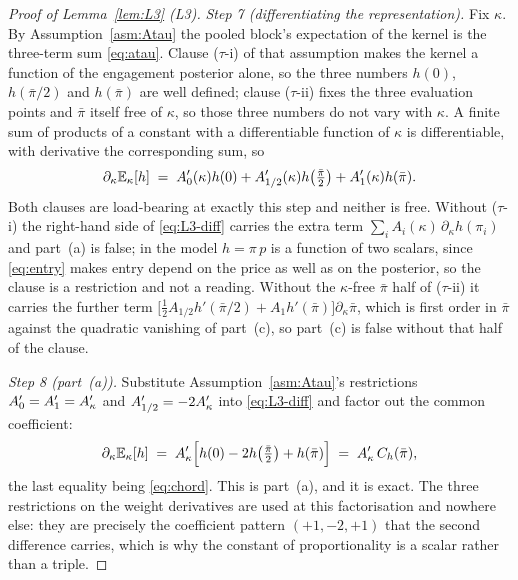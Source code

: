 \begin{proof}[Proof of Lemma~\ref{lem:L3} (L3)]
\emph{Step 7 (differentiating the representation).} Fix $\kappa$. By Assumption~\ref{asm:Atau} the
pooled block's expectation of the kernel is the three-term sum \eqref{eq:atau}. Clause ($\tau$-i) of
that assumption makes the kernel a function of the engagement posterior alone, so the three numbers
$h(0)$, $h(\bar\pi/2)$ and $h(\bar\pi)$ are well defined; clause ($\tau$-ii) fixes the three
evaluation points and $\bar\pi$ itself free of $\kappa$, so those three numbers do not vary with
$\kappa$. A finite sum of products of a constant with a differentiable function of $\kappa$ is
differentiable, with derivative the corresponding sum, so
\begin{equation}
\label{eq:L3-diff}
\partial_\kappa \mathbb{E}_\kappa[h] \;=\; A_0'(\kappa)h(0)
 + A_{1/2}'(\kappa)h\!\left(\tfrac{\bar\pi}{2}\right) + A_1'(\kappa)h(\bar\pi).
\end{equation}
Both clauses are load-bearing at exactly this step and neither is free. Without ($\tau$-i) the
right-hand side of \eqref{eq:L3-diff} carries the extra term
$\sum_i A_i(\kappa)\,\partial_\kappa h(\pi_i)$ and part~(a) is false; in the model
$h = \pi\,p$ is a function of two scalars, since \eqref{eq:entry} makes entry depend on the price as
well as on the posterior, so the clause is a restriction and not a reading. Without the $\kappa$-free
$\bar\pi$ half of ($\tau$-ii) it carries the further term
$\bigl[\tfrac12 A_{1/2}h'(\bar\pi/2) + A_1 h'(\bar\pi)\bigr]\partial_\kappa\bar\pi$, which is first
order in $\bar\pi$ against the quadratic vanishing of part~(c), so part~(c) is false without that
half of the clause.

\emph{Step 8 (part~(a)).} Substitute Assumption~\ref{asm:Atau}'s restrictions
$A_0' = A_1' = A'_{\kappa}$ and $A_{1/2}' = -2A'_{\kappa}$ into \eqref{eq:L3-diff} and factor out the common
coefficient:
\begin{equation}
\label{eq:L3-parta}
\partial_\kappa \mathbb{E}_\kappa[h]
 \;=\; A'_{\kappa}\Bigl[h(0) - 2h\!\left(\tfrac{\bar\pi}{2}\right) + h(\bar\pi)\Bigr]
 \;=\; A'_{\kappa}\,C_h(\bar\pi),
\end{equation}
the last equality being \eqref{eq:chord}. This is part~(a), and it is exact. The three restrictions
on the weight derivatives are used at this factorisation and nowhere else: they are precisely the
coefficient pattern $(+1,-2,+1)$ that the second difference carries, which is why the constant of
proportionality is a scalar rather than a triple.


\end{proof}
